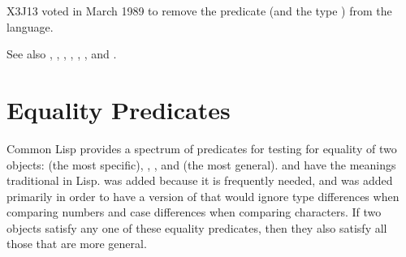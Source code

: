 \begin{newer}
X3J13 voted in March 1989
to remove the predicate  (and the type ) from the
language.
\end{newer}

\medskip

See also , ,
, ,
,
, and .

\section{Equality Predicates}

Common Lisp provides a spectrum of predicates for testing for equality of
two objects:  (the most specific), , , and 
(the most general).   and  have the meanings traditional
in Lisp.   was added because it is frequently needed, and
 was added primarily in order to have a version of 
that would ignore type differences when comparing numbers
and case differences when comparing characters.
If two objects satisfy any one of these equality predicates,
then they also satisfy all those that are more general.

